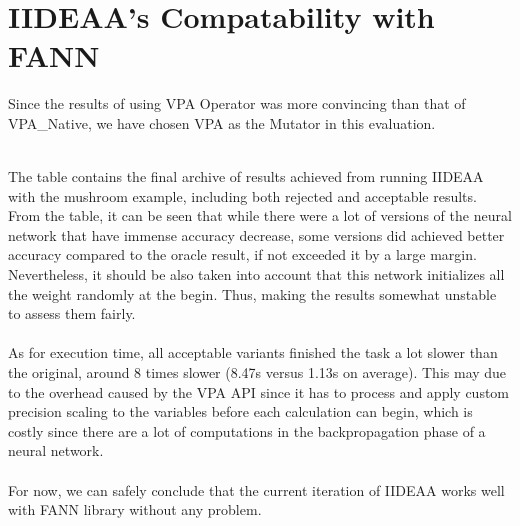 \section{IIDEAA's Compatability with FANN}
Since the results of using VPA Operator was more convincing than that of VPA\_Native, we have chosen VPA as the Mutator in this evaluation. \\
\begingroup
\begin{table}[H]

\end{table}
\endgroup
~\\
The table contains the final archive of results achieved from running IIDEAA with the mushroom example, including both rejected and acceptable results. From the table, it can be seen that while there were a lot of versions of the neural network that have immense accuracy decrease, some versions did achieved better accuracy compared to the oracle result, if not exceeded it by a large margin. Nevertheless, it should be also taken into account that this network initializes all the weight randomly at the begin. Thus, making the results somewhat unstable to assess them fairly. \\
~\\
As for execution time, all acceptable variants finished the task a lot slower than the original, around 8 times slower (8.47s versus 1.13s on average). This may due to the overhead caused by the VPA API since it has to process and apply custom precision scaling to the variables before each calculation can begin, which is costly since there are a lot of computations in the backpropagation phase of a neural network. \\
~\\
For now, we can safely conclude that the current iteration of IIDEAA works well with FANN library without any problem. \\